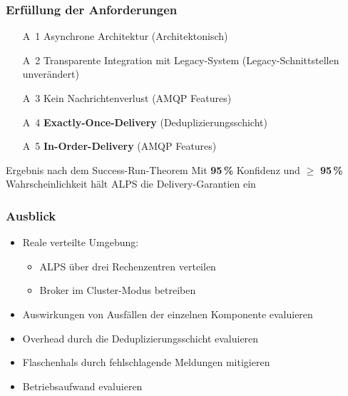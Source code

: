\documentclass[11pt,aspectratio=1610]{beamer} %
\newif\iffootagendaon
\begin{document}
\begin{frame}
    \frametitle{Erfüllung der Anforderungen}

    \begin{itemize}
        \item[A~1] Asynchrone Architektur \hfill (Architektonisch)
        \item[A~2] Transparente Integration mit Legacy-System \hfill (Legacy-Schnittstellen unverändert)
        \item[A~3] Kein Nachrichtenverlust \hfill (AMQP Features)
        \item[A~4] \textbf{Exactly-Once-Delivery} \hfill (Deduplizierungsschicht)
        \item[A~5] \textbf{In-Order-Delivery} \hfill (AMQP Features)
    \end{itemize}

    \pause

    \begin{block}{Ergebnis nach dem Success-Run-Theorem}
        Mit \textbf{95\,\%} Konfidenz und $\geq$ \textbf{95\,\%} Wahrscheinlichkeit hält ALPS die Delivery-Garantien ein
    \end{block}
\end{frame}

\begin{frame}
    \frametitle{Ausblick}

    \begin{itemize}
        \item Reale verteilte Umgebung:
              \begin{itemize}
                  \item ALPS über drei Rechenzentren verteilen
                  \item Broker im Cluster-Modus betreiben
              \end{itemize}
        \item Auswirkungen von Ausfällen der einzelnen Komponente evaluieren
        \item Overhead durch die Deduplizierungsschicht evaluieren
        \item Flaschenhals durch fehlschlagende Meldungen mitigieren
        \item Betriebsaufwand evaluieren
    \end{itemize}
\end{frame}

\footagendaonfalse %
\end{document}
